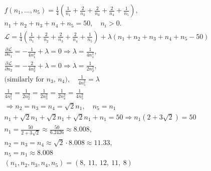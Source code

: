 \documentclass{article}
\begin{document}
\[
	\begin{split}
		f(n_1, \ldots, n_5) = \frac{1}{4} \left( \frac{1}{n_1} + \frac{2}{n_2} + \frac{2}{n_3} + \frac{2}{n_4} + \frac{1}{n_5} \right),                                    \\
		n_1 + n_2 + n_3 + n_4 + n_5 = 50, \quad n_i > 0.                                                                                                                   \\
		\mathcal{L} = \frac{1}{4} \left( \frac{1}{n_1} + \frac{2}{n_2} + \frac{2}{n_3} + \frac{2}{n_4} + \frac{1}{n_5} \right) + \lambda(n_1 + n_2 + n_3 + n_4 + n_5 - 50) \\
		\frac{\partial \mathcal{L}}{\partial n_1} = -\frac{1}{4n_1^2} + \lambda = 0 \Rightarrow \lambda = \frac{1}{4n_1^2},                                                \\
		\frac{\partial \mathcal{L}}{\partial n_2} = -\frac{2}{4n_2^2} + \lambda = 0 \Rightarrow \lambda = \frac{1}{2n_2^2},                                                \\
		\text{(similarly for $n_3$, $n_4$)}, \quad \frac{1}{4n_5^2} = \lambda                                                                                              \\
		\frac{1}{4n_1^2} = \frac{1}{2n_2^2} = \frac{1}{2n_3^2} = \frac{1}{2n_4^2} = \frac{1}{4n_5^2}                                                                       \\
		\Rightarrow n_2 = n_3 = n_4 = \sqrt{2}n_1, \quad n_5 = n_1                                                                                                         \\
		n_1 + \sqrt{2}n_1 + \sqrt{2}n_1 + \sqrt{2}n_1 + n_1 = 50 \Rightarrow n_1(2 + 3\sqrt{2}) = 50                                                                       \\
		n_1 = \frac{50}{2 + 3\sqrt{2}} \approx \frac{50}{6.2426} \approx 8.008, \quad                                                                                      \\
		n_2 = n_3 = n_4 \approx \sqrt{2} \cdot 8.008 \approx 11.33, \quad                                                                                                  \\
		n_5 = n_1 \approx 8.008                                                                                                                                            \\
		(n_1, n_2, n_3, n_4, n_5) = (8,\ 11,\ 12,\ 11,\ 8)                                                                                                                 \\
	\end{split}
\]
\end{document}

